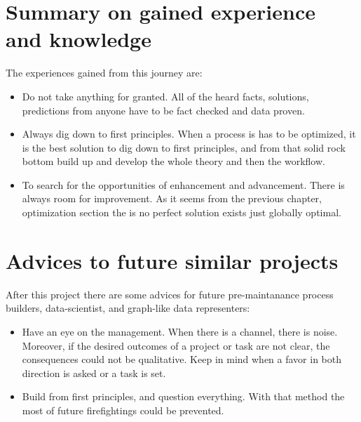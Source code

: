 \section{Summary on gained experience and knowledge}
The experiences gained from this journey are:
\begin{itemize}
	\item{Do not take anything for granted.} All of the heard facts, solutions, predictions from anyone have to be fact checked and data proven.
	\item{Always dig down to first principles.} When a process is has to be optimized, it is the best solution to dig down to first principles, and from that solid rock bottom build up and develop the whole theory and then the workflow.
	\item{To search for the opportunities of enhancement and advancement.} There is always room for improvement. As it seems from the previous chapter, optimization section the is no perfect solution exists just globally optimal. 
\end{itemize}
\section{Advices to future similar projects}
After this project there are some advices for future pre-maintanance process builders, data-scientist, and graph-like data representers:
\begin{itemize}
	\item{Have an eye on the management.} When there is a channel, there is noise. Moreover, if the desired outcomes of a project or task are not clear, the consequences could not be qualitative. Keep in mind when a favor in both direction is asked or a task is set.
	\item{Build from first principles, and question everything.} With that method the most of future firefightings could be prevented.
\end{itemize}